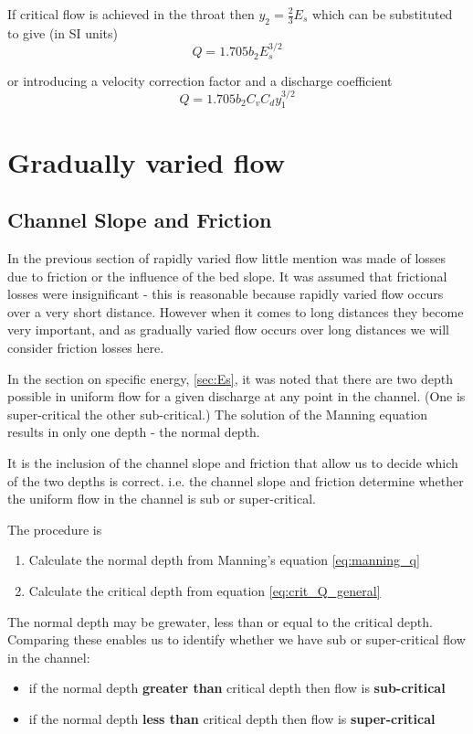 \documentclass[a4paper, 12pt, british]{article} %
\numberwithin{equation}{section}
\numberwithin{figure}{section}
\numberwithin{table}{section}
\begin{document}
If critical flow is achieved in the throat then $y_2 = \frac{2}{3} E_s$ which can be substituted to give (in SI units)
\begin{equation*}
Q = 1.705 b_2 E_s^{3/2}
\end{equation*} 

or introducing a velocity correction factor and a discharge coefficient
\begin{equation}
Q = 1.705 b_2 C_v C_d y_1^{3/2}
\label{eq:venturi_flume}
\end{equation} 



\newpage
\section{Gradually varied flow}
\subsection{Channel Slope and Friction}
In the previous section of rapidly varied flow little mention was made of losses due to friction or the influence of the bed slope. It was assumed that frictional losses were insignificant - this is reasonable because rapidly varied flow occurs over a very short distance. However when it comes to long distances they become very important, and as gradually varied flow occurs over long distances we will consider friction losses here.

In the section on specific energy, \ref{sec:Es}, it was noted that there are two depth possible in uniform flow for a given discharge at any point in the channel. (One is super-critical the other sub-critical.) The solution of the Manning equation results in only one depth - the normal depth. 

It is the inclusion of the channel slope and friction that allow us to decide which of the two depths is correct. i.e. the channel slope and friction determine whether the uniform flow in the channel is sub or super-critical.

The procedure is 
\begin{enumerate}
	\item Calculate the normal depth from Manning's equation \ref{eq:manning_q}
	\item Calculate the critical depth from equation \ref{eq:crit_Q_general}
\end{enumerate}
The normal depth may be grewater, less than or equal to the critical depth. 
Comparing these enables us to identify whether we have sub or super-critical flow in the channel:
\begin{itemize}
	\item if the normal depth \textbf{greater than} critical depth then flow is \textbf{sub-critical}
	\item if the normal depth \textbf{less than} critical depth then flow is \textbf{super-critical}
\end{itemize}
\end{document}
